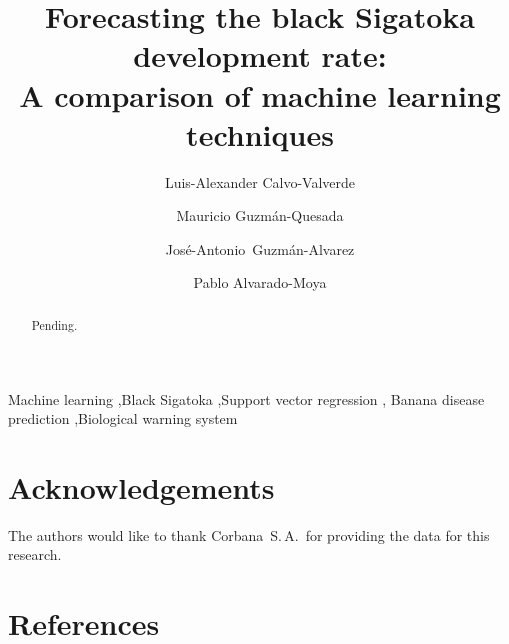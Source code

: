 \documentclass[review,authoryear,english]{elsarticle}
\begin{document}
  \graphicspath{{./}{./fig/}}

\begin{frontmatter}

\title{Forecasting the black Sigatoka development rate:\\ 
A comparison of machine learning techniques}

\author[afiLuisAlex]{Luis-Alexander Calvo-Valverde}

\author[afiCorbana]{Mauricio Guzmán-Quesada}
\author[afiCorbana]{José-Antonio~Guzmán-Alvarez}
\author[afiPablo]{Pablo Alvarado-Moya}

\address[afiLuisAlex]{DOCINADE, Instituto Tecnológico de Costa Rica, 
Computer Research Center, Multidisciplinar program eScience, Cartago, Costa Rica}

\address[afiCorbana]{Dirección de Investigaciones, Corporación Bananera Nacional~S.\,A., Guápiles, Costa Rica}

\address[afiPablo]{DOCINADE, Instituto Tecnológico de Costa Rica, Cartago, Costa Rica}

\begin{abstract}
Pending.
\end{abstract}

\begin{keyword}
Machine learning \sep Black Sigatoka \sep Support vector regression \sep
Banana disease prediction \sep Biological warning system 
\end{keyword}

\end{frontmatter}

\linenumbers








\section*{Acknowledgements}

The authors would like to thank Corbana~S.\,A.\ for providing the data
for this research.

\section*{References}


\end{document}
